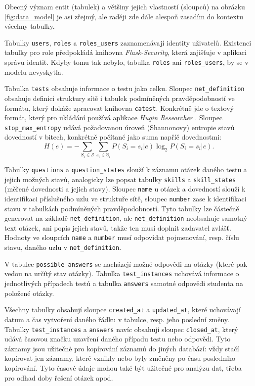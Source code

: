 \documentclass[a4paper,twoside,12pt]{scrbook}
\begin{document}
Obecný význam entit (tabulek) a většiny jejich vlastností (sloupců) na obrázku \ref{fig:data_model} je asi zřejmý, ale raději zde dále alespoň zasadím do kontextu všechny tabulky.

Tabulky \texttt{users}, \texttt{roles} a \texttt{roles\_users} zaznamenávají identity uživatelů. Existenci tabulky pro role předpokládá knihovna \textit{Flask-Security}, která zajišťuje v aplikaci správu identit. Kdyby tomu tak nebylo, tabulka \texttt{roles} ani \texttt{roles\_users}, by se v modelu nevyskytla. \cite{Flask-Security}

Tabulka \texttt{tests} obsahuje informace o testu jako celku. Sloupec \texttt{net\_definition} obsahuje definici struktury sítě i tabulek podmíněných pravděpodobností ve formátu, který dokáže zpracovat knihovna \texttt{catest}. Konkrétně jde o textový formát, který pro ukládání používá aplikace \textit{Hugin Researcher} \cite{hugin}. Sloupec \texttt{stop\_max\_entropy} udává požadovanou úroveň (Shannonovy) entropie stavů dovedností v bitech, konkrétně počítané jako suma napříč dovednostmi:
\begin{equation}
	H(e) = -\sum_{S_i \in \mathcal{S}}\sum_{s_i \in \mathbb{S}_i}P(S_i=s_i|e) \log_2 P(S_i=s_i|e).
\end{equation}

Tabulky \texttt{questions} a \texttt{question\_states} slouží k záznamu otázek daného testu a jejich možných stavů, analogicky lze popsat tabulky \texttt{skills} a \texttt{skill\_states} (měřené dovednosti a jejich stavy). Sloupec \texttt{name} u otázek a dovedností slouží k identifikaci příslušného uzlu ve struktuře sítě, sloupec \texttt{number} zase k identifikaci stavu v tabulkách podmíněných pravděpodobností. Tyto tabulky lze částečně generovat na základě \texttt{net\_definition}, ale \texttt{net\_definition} neobsahuje samotný text otázek, ani popis jejich stavů, takže ten musí doplnit zadavatel zvlášť. Hodnoty ve sloupcích \texttt{name} a \texttt{number} musí odpovídat pojmenování, resp. číslu stavu, daného uzlu v \texttt{net\_definition}.

V tabulce \texttt{possible\_answers} se nacházejí možné odpovědi na otázky (které pak vedou na určítý stav otázky). Tabulka \texttt{test\_instances} uchovává informace o jednotlivých případech testů a tabulka \texttt{answers} samotné odpovědi studenta na položené otázky.

Všechny tabulky obsahují sloupce \texttt{created\_at} a \texttt{updated\_at}, které uchovávají datum a čas vytvoření daného řádku v tabulce, resp. jeho poslední změny. Tabulky \texttt{test\_instances} a \texttt{answers} navíc obsahují sloupec \texttt{closed\_at}, který udává časovou značku uzavření daného případu testu nebo odpovědi. Tyto záznamy jsou užitečné pro kopírování záznamů do jiných databází: vždy stačí kopírovat jen záznamy, které vznikly nebo byly změněny po času posledního kopírování. Tyto časové údaje mohou také být užitečné pro analýzu dat, třeba pro odhad doby řešení otázek apod.
\end{document}
